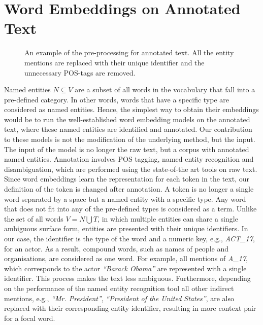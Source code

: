 \section{Word Embeddings on Annotated Text}\label{sec:annotated}
\begin{figure}
\centering 
\resizebox{0.85\textwidth}{0.28\textwidth}{      

}
\caption{An example of the pre-processing for annotated text. All the entity mentions are replaced with their unique identifier and the unnecessary POS-tags are removed.}
\label{fig:annotation}
\end{figure}
Named entities $N \subseteq V$ are a subset of all words in the vocabulary that fall into a pre-defined category.
In other words, words that have a specific type are considered as named entities. Hence, the simplest way to obtain their embeddings would be to run the well-established word embedding models on the annotated text, where these named entities are identified and annotated. Our contribution to these models is not the modification of the underlying method, but the input. The input of the model is no longer the raw text, but a corpus with annotated named entities. Annotation involves POS tagging, named entity recognition and disambiguation, which are performed using the state-of-the art tools on raw text.
Since word embeddings learn the representation for each token in the text, our definition of the token is changed after annotation. A token is no longer a single word separated by a space but a named entity with a specific type. Any word that does not fit into any of the pre-defined types is considered as a term. Unlike the set of all words $V=N \bigcup T $, in which multiple entities can share a single ambiguous surface form, entities are presented with their unique identifiers. In our case, the identifier is the type of the word and a numeric key, e.g., \emph{ACT\_17}, for an actor. As a result, compound words, such as names of people and organisations, are considered as one word. For example, all mentions of \emph{A\_17}, which corresponds to the actor \emph{``Barack Obama''} are represented with a single identifier.
This process makes the text less ambiguous.
Furthermore, depending on the performance of the named entity recognition tool all other indirect mentions, e.g., \emph{``Mr. President''}, \emph{``President of the United States''}, are also replaced with their corresponding entity identifier, resulting in more context pair for a focal word.
